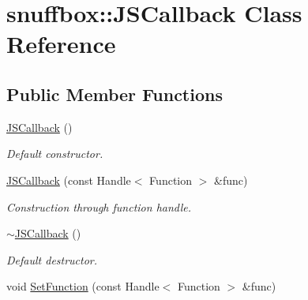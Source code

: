 \hypertarget{classsnuffbox_1_1_j_s_callback}{\section{snuffbox\-:\-:J\-S\-Callback Class Reference}
\label{classsnuffbox_1_1_j_s_callback}
}
\subsection*{Public Member Functions}
\begin{DoxyCompactItemize}
\item 
\hypertarget{classsnuffbox_1_1_j_s_callback_afb1679973c11acc5a2687e29b9cc363f}{\hyperlink{classsnuffbox_1_1_j_s_callback_afb1679973c11acc5a2687e29b9cc363f}{J\-S\-Callback} ()}\label{classsnuffbox_1_1_j_s_callback_afb1679973c11acc5a2687e29b9cc363f}

\begin{DoxyCompactList}\small\item\em Default constructor. \end{DoxyCompactList}\item 
\hypertarget{classsnuffbox_1_1_j_s_callback_ad4520c9f0906aba0d0761309c5fa1ffa}{\hyperlink{classsnuffbox_1_1_j_s_callback_ad4520c9f0906aba0d0761309c5fa1ffa}{J\-S\-Callback} (const Handle$<$ Function $>$ \&func)}\label{classsnuffbox_1_1_j_s_callback_ad4520c9f0906aba0d0761309c5fa1ffa}

\begin{DoxyCompactList}\small\item\em Construction through function handle. \end{DoxyCompactList}\item 
\hypertarget{classsnuffbox_1_1_j_s_callback_a3a06b2d73000f8db647de13f6fce388e}{\hyperlink{classsnuffbox_1_1_j_s_callback_a3a06b2d73000f8db647de13f6fce388e}{$\sim$\-J\-S\-Callback} ()}\label{classsnuffbox_1_1_j_s_callback_a3a06b2d73000f8db647de13f6fce388e}

\begin{DoxyCompactList}\small\item\em Default destructor. \end{DoxyCompactList}\item 
\hypertarget{classsnuffbox_1_1_j_s_callback_a67b9c211cfb5c6ada010f9d54294903f}{void \hyperlink{classsnuffbox_1_1_j_s_callback_a67b9c211cfb5c6ada010f9d54294903f}{Set\-Function} (const Handle$<$ Function $>$ \&func)}\label{classsnuffbox_1_1_j_s_callback_a67b9c211cfb5c6ada010f9d54294903f}


\end{DoxyCompactItemize}
